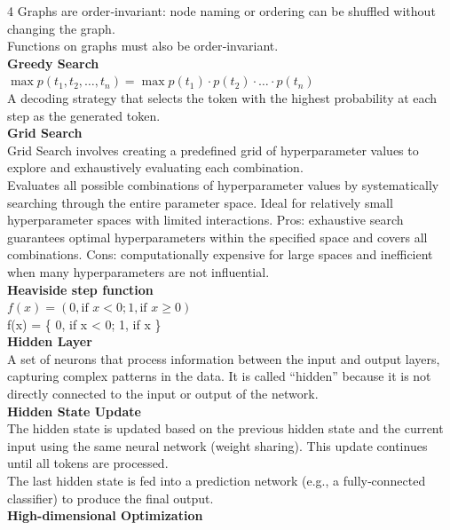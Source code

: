 \documentclass[8pt]{extarticle}
\begin{document}
\begin{multicols}{4}
Graphs are order‑invariant: node naming or ordering can be shuffled without changing the graph.\\
Functions on graphs must also be order‑invariant.\\
\vspace{2pt}\textbf{Greedy Search}\\
$ \max p(t_1, t_2, \dots, t_n) = \max p(t_1) \cdot p(t_2) \cdot \dots \cdot p(t_n) $\\
A decoding strategy that selects the token with the highest probability at each step as the generated token.\\
\vspace{2pt}\textbf{Grid Search}\\
Grid Search involves creating a predefined grid of hyperparameter values to explore and exhaustively evaluating each combination.\\
Evaluates all possible combinations of hyperparameter values by systematically searching through the entire parameter space. Ideal for relatively small hyperparameter spaces with limited interactions. Pros: exhaustive search guarantees optimal hyperparameters within the specified space and covers all combinations. Cons: computationally expensive for large spaces and inefficient when many hyperparameters are not influential.\\
\vspace{2pt}\textbf{Heaviside step function}\\
$f(x) = (0, \text{if } x < 0; 1, \text{if } x \ge 0)$\\
f(x) = \{ 0, if x < 0; 1, if x  \}\\
\vspace{2pt}\textbf{Hidden Layer}\\
A set of neurons that process information between the input and output layers, capturing complex patterns in the data. It is called “hidden” because it is not directly connected to the input or output of the network.\\
\vspace{2pt}\textbf{Hidden State Update}\\
The hidden state is updated based on the previous hidden state and the current input using the same neural network (weight sharing). This update continues until all tokens are processed.\\
The last hidden state is fed into a prediction network (e.g., a fully‑connected classifier) to produce the final output.\\
\vspace{2pt}\textbf{High-dimensional Optimization}\\

\end{multicols}
\end{document}
